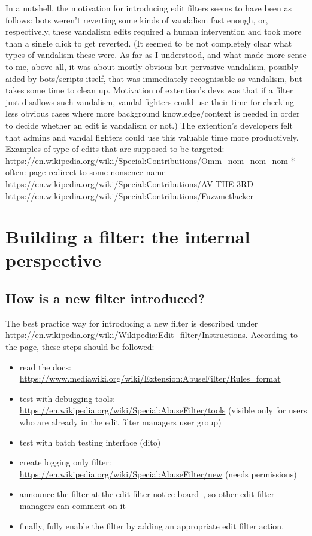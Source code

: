 In a nutshell, the motivation for introducing edit filters seems to have been as follows:
bots weren't reverting some kinds of vandalism fast enough, or, respectively, these vandalism edits required a human intervention and took more than a single click to get reverted.
(It seemed to be not completely clear what types of vandalism these were.
As far as I understood, and what made more sense to me, above all, it was about mostly obvious but pervasive vandalism, possibly aided by bots/scripts itself, that was immediately recognisable as vandalism, but takes some time to clean up.
Motivation of extention's devs was that if a filter just disallows such vandalism, vandal fighters could use their time for checking less obvious cases where more background knowledge/context is needed in order to decide whether an edit is vandalism or not.)
The extention's developers felt that admins and vandal fighters could use this valuable time more productively.
Examples of type of edits that are supposed to be targeted:
\url{https://en.wikipedia.org/wiki/Special:Contributions/Omm_nom_nom_nom}
* often: page redirect to some nonsence name
\url{https://en.wikipedia.org/wiki/Special:Contributions/AV-THE-3RD}
\url{https://en.wikipedia.org/wiki/Special:Contributions/Fuzzmetlacker}



\section{Building a filter: the internal perspective}
\subsection{How is a new filter introduced?}

The best practice way for introducing a new filter is described under \url{https://en.wikipedia.org/wiki/Wikipedia:Edit_filter/Instructions}.
According to the page, these steps should be followed:
\begin{itemize}
    \item read the docs: \url{https://www.mediawiki.org/wiki/Extension:AbuseFilter/Rules_format}
    \item test with debugging tools: \url{https://en.wikipedia.org/wiki/Special:AbuseFilter/tools} (visible only for users who are already in the edit filter managers user group)
    \item test with batch testing interface (dito)
    \item create logging only filter: \url{https://en.wikipedia.org/wiki/Special:AbuseFilter/new} (needs permissions)
    \item announce the filter at the edit filter notice board~\cite{Wikipedia:EditFilterNoticeboard}, so other edit filter managers can comment on it
    \item finally, fully enable the filter by adding an appropriate edit filter action.
\end{itemize}

